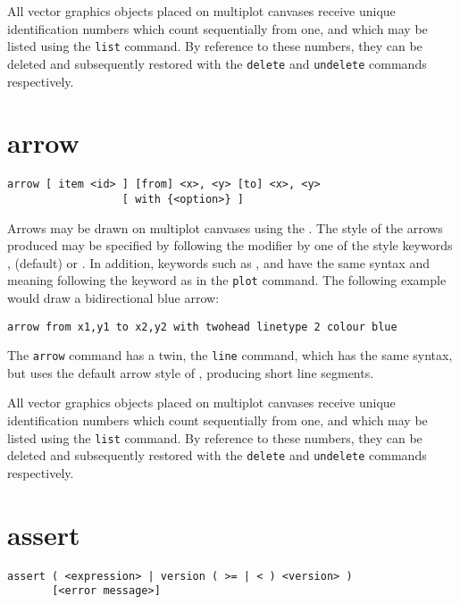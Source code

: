 All vector graphics objects placed on multiplot canvases receive unique
identification numbers which count sequentially from one, and which may be
listed using the {\tt list} command.  By reference to these numbers, they can
be deleted and subsequently restored with the {\tt delete} and {\tt undelete}
commands respectively.


\section{arrow}

\begin{verbatim}
arrow [ item <id> ] [from] <x>, <y> [to] <x>, <y>
                  [ with {<option>} ]
\end{verbatim}

Arrows may be drawn on multiplot canvases using the . The style
of the arrows produced may be specified by following the 
modifier by one of the style keywords , 
(default) or . In addition, keywords such as ,
 and  have the same syntax and meaning
following the keyword  as in the {\tt plot} command. The
following example would draw a bidirectional blue arrow:

\begin{verbatim}
arrow from x1,y1 to x2,y2 with twohead linetype 2 colour blue
\end{verbatim}

The {\tt arrow} command has a twin, the {\tt line} command, which has the same
syntax, but uses the default arrow style of , producing short
line segments.

All vector graphics objects placed on multiplot canvases receive unique
identification numbers which count sequentially from one, and which may be
listed using the {\tt list} command.  By reference to these numbers, they can
be deleted and subsequently restored with the {\tt delete} and {\tt undelete}
commands respectively.


\section{assert}

\begin{verbatim}
assert ( <expression> | version ( >= | < ) <version> )
       [<error message>]
\end{verbatim}


